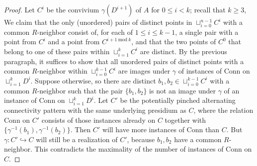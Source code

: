 \documentclass{amsart}
\theoremstyle{definition}
\theoremstyle{remark}
\numberwithin{equation}{section}
\begin{document}
\begin{proof}
Let $C^{i}$ be the convivium $\gamma(D^{i+1})$ of $A$ for $0 \leq i < k$; recall that $k \geq 3$, We claim that the only (unordered) pairs of distinct points in $\sqcup^{n-1}_{i=0} C^{i}$ with a common $R$-neighbor consist of, for each of $1 \leq i \leq k-1$, a single pair with a point from $C^{i}$ and a point from $C^{i+1 \mathrm{\: mod \:} k}$, and that the two points of $C^{0}$ that belong to one of these pairs within $\sqcup^{k}_{i =1} C^{i}$ are distinct. By the previous paragraph, it suffices to show that all unordered pairs of distinct points with a common $R$-neighbor within $\sqcup^{k-1}_{i=0} C^{i}$ are images under $\gamma$ of instances of $\mathrm{Conn}$ on $\sqcup^{k}_{i =1} D^{i}$.  Suppose otherwise, so there are distinct $b_1, b_2 \in \sqcup^{k-1}_{i=0} C^{i}$ with a common $R$-neighbor such that the pair $\{b_1, b_2\}$ is not an image under $\gamma$ of an instance of $\mathrm{Conn}$ on $\sqcup^{k}_{i =1} D^{i}$. Let $C'$ be the potentially pinched alternating connectivity pattern with the same underlying presidium as $C$, where the relation $\mathrm{Conn}$ on $C'$ consists of those instances already on $C$ together with $\{\gamma^{-1}(b_1), \gamma^{-1}(b_2)\}$. Then $C'$ will have more instances of $\mathrm{Conn}$ than $C$. But $\gamma: C' \hookrightarrow C$ will still be a realization of $C'$, because $b_{1}, b_{2}$ have a common $R$-neighbor. This contradicts the maximality of the number of instances of $\mathrm{Conn}$ on $C$.


\end{proof}
\end{document}

